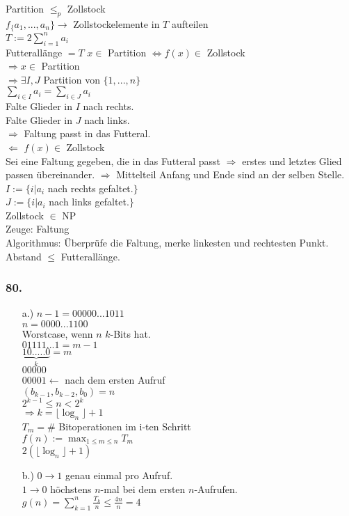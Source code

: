 \documentclass[ngerman,a4paper]{report}
\begin{document}
Partition $\leq_p$ Zollstock\\
$f_ \{a_1,...,a_n\} \rightarrow $  Zollstockelemente in $T$ aufteilen\\
$T:=2\sum_{i=1}^n a_i$\\
Futterallänge $=T$
$x \in $ Partition $\iff f(x) \in$ Zollstock\\
$\Rightarrow x \in $ Partition\\
$\Rightarrow \exists I, J$ Partition von $\{1,...,n\}$\\
$\sum_{i \in I} a_i = \sum_{i \in J} a_i$\\
Falte Glieder in $I$ nach rechts.\\   
Falte Glieder in $J$ nach links.\\
$\Rightarrow$ Faltung passt in das Futteral. \\
$\Leftarrow$ $f(x) \in $ Zollstock\\
Sei eine Faltung gegeben, die in das Futteral passt $\Rightarrow$ erstes und letztes Glied passen übereinander. $\Rightarrow$ Mittelteil Anfang und Ende sind an der selben Stelle.\\
$I := \{i | a_i $ nach rechts gefaltet.$\}$\\
$J := \{i | a_i $ nach links gefaltet.$\}$\\
Zollstock $\in$ NP\\
Zeuge: Faltung\\
Algorithmus: Überprüfe die Faltung, merke linkesten und rechtesten Punkt. Abstand $\leq $ Futterallänge.\\

\subsubsection*{80.}
\begin{enumerate}
\item[a.)] $n-1=00000...1011$\\
$n=0000...1100$\\
Worstcase, wenn $n$ $k$-Bits hat.\\
$01111...1 = m-1$\\
$\underbrace{10.....0}_{k} = m$\\
$00000$\\
$00001 \leftarrow$ nach dem ersten Aufruf\\
$(b_{k-1},b_{k-2},b_{0}) = n$\\
$2^{k-1} \leq n < 2^k$\\
$\Rightarrow k = \lfloor \log_n \rfloor +1$\\
$T_m = $\# Bitoperationen im i-ten Schritt\\
$f(n) := \max_{1 \leq m \leq n} T_m $\\
$2 (\lfloor \log_n \rfloor +1 )$
\item[b.)] $0 \rightarrow 1$ genau einmal pro Aufruf.\\
$1 \rightarrow 0$ höchstens $n$-mal bei dem ersten $n$-Aufrufen.\\
$g(n) = \sum_{k=1}^n \frac{T_k}{n} \leq \frac{4n}{n} = 4$\\
\end{enumerate}
\end{document}
